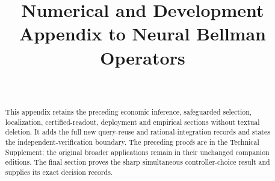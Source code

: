 \documentclass[ecta,nameyear,draft]{econsocart}
\begin{document}
\begin{frontmatter}
\title{Numerical and Development Appendix to Neural Bellman Operators}
\begin{aug}
\author[id=au1,addressref={add1}]{~}
\address[id=add1]{Peking University}
\end{aug}
\begin{abstract}
This appendix retains the preceding economic inference, safeguarded selection, localization, certified-readout, deployment and empirical sections without textual deletion. It adds the full new query-reuse and rational-integration records and states the independent-verification boundary. The preceding proofs are in the Technical Supplement; the original broader applications remain in their unchanged companion editions. The final section proves the sharp simultaneous controller-choice result and supplies its exact decision records.
\end{abstract}
\end{frontmatter}
\appendix


















\end{document}
